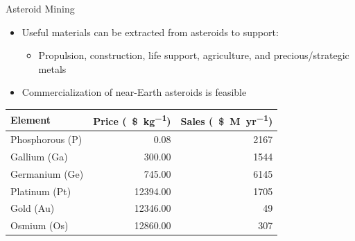 \begin{frame}{Asteroid Mining}
    \begin{itemize}
      \item Useful materials can be extracted from asteroids to support:
      \begin{itemize}
          \item Propulsion, construction, life support, agriculture, and precious/strategic metals
      \end{itemize}
      \item Commercialization of near-Earth asteroids is feasible
    \end{itemize}

\pause

\begin{center}
\small
    \begin{tabular}{|l|r|r|}
        \hline 
        Element & Price (\SI{}{\$\per\kilo\gram}) & Sales (\SI{}{\$M\per yr}) \\
        \hline \hline 
        Phosphorous (P) & \num{0.08}  & \num{2167} \\
        Gallium (Ga) & \num{300.00}  & \num{1544} \\
        Germanium (Ge) & \num{745.00} & \num{6145} \\
        \hline \hline 
        Platinum (Pt) & \num{12394.00} & \num{1705} \\
        Gold (Au) & \num{12346.00} & \num{49} \\
        Osmium (Os) & \num{12860.00} & \num{307} \\
        \hline
    \end{tabular}
\end{center}

\end{frame}

